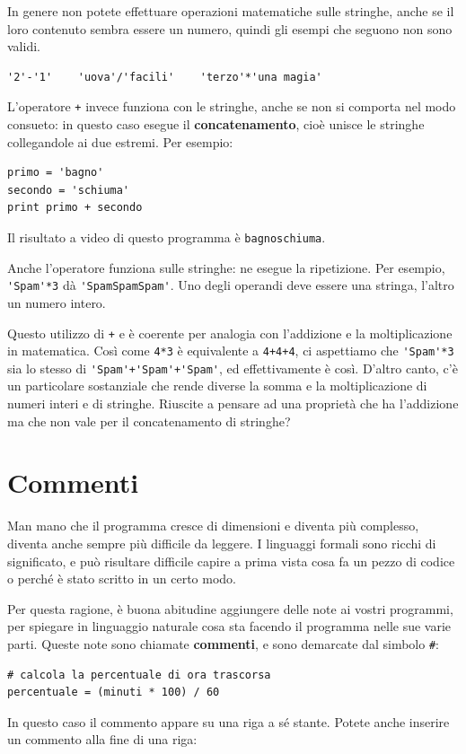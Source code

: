 \documentclass[10pt]{book}
\begin{document}
In genere non potete effettuare operazioni matematiche sulle stringhe, anche se il loro contenuto sembra essere un numero, quindi gli esempi che seguono non sono validi.

\begin{verbatim}
'2'-'1'    'uova'/'facili'    'terzo'*'una magia'
\end{verbatim}
%
L'operatore {\tt +} invece funziona con le stringhe, anche se non si comporta nel modo consueto: in questo caso esegue il {\bf concatenamento}, cioè unisce le stringhe collegandole ai due estremi. Per esempio:

\begin{verbatim}
primo = 'bagno'
secondo = 'schiuma'
print primo + secondo
\end{verbatim}
%
Il risultato a video di questo programma è {\tt bagnoschiuma}.

Anche l'operatore {\tt *} funziona sulle stringhe: ne esegue la ripetizione. Per esempio, \verb"'Spam'*3" dà \verb"'SpamSpamSpam'". Uno degli operandi deve essere una stringa, l'altro un numero intero.

Questo utilizzo di {\tt +} e {\tt *} è coerente per analogia con l'addizione e la moltiplicazione in matematica. Così come {\tt 4*3} è equivalente a {\tt 4+4+4}, ci aspettiamo che \verb"'Spam'*3" sia lo stesso di
\verb"'Spam'+'Spam'+'Spam'", ed effettivamente è così. D'altro canto, c'è un particolare sostanziale che rende diverse la somma e la moltiplicazione di numeri interi e di stringhe. Riuscite a pensare ad una proprietà che ha l'addizione ma che non vale per il concatenamento di stringhe?


\section{Commenti}

Man mano che il programma cresce di dimensioni e diventa più complesso, diventa anche sempre più difficile da leggere. I linguaggi formali sono ricchi di significato, e può risultare difficile capire a prima vista cosa fa un pezzo di codice o perché è stato scritto in un certo modo.

Per questa ragione, è buona abitudine aggiungere delle note ai vostri   programmi, per spiegare in linguaggio naturale cosa sta facendo il programma nelle sue varie parti. Queste note sono chiamate {\bf commenti}, e sono demarcate dal simbolo \verb"#":

\begin{verbatim}
# calcola la percentuale di ora trascorsa
percentuale = (minuti * 100) / 60
\end{verbatim}
%
In questo caso il commento appare su una riga a sé stante. Potete anche inserire un commento alla fine di una riga:
\end{document}
